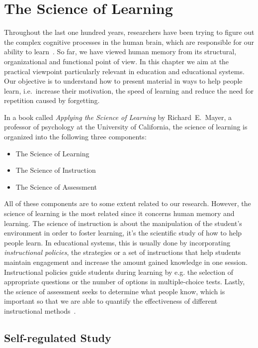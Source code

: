 \section{The Science of Learning}
\label{science-of-learning}

Throughout the last one hundred years, researchers have been trying to figure out the complex cognitive processes in the human brain, which are responsible for our ability to learn~\cite{RichardE.Mayer2010}. So far, we have viewed human memory from its structural, organizational and functional point of view. In this chapter we aim at the practical viewpoint particularly relevant in education and educational systems. Our objective is to understand how to present material in ways to help people learn, i.e.~increase their motivation, the speed of learning and reduce the need for repetition caused by forgetting.

In a book called \textit{Applying the Science of Learning} by Richard~E.~Mayer, a professor of psychology at the University of California, the science of learning is organized into the following three components:

\begin{itemize}
  \item The Science of Learning
  \item The Science of Instruction
  \item The Science of Assessment
\end{itemize}

All of these components are to some extent related to our research. However, the science of learning is the most related since it concerns human memory and learning. The science of instruction is about the manipulation of the student's environment in order to foster learning, it's the scientific study of how to help people learn. In educational systems, this is usually done by incorporating \textit{instructional policies}, the strategies or a set of instructions that help students maintain engagement and increase the amount gained knowledge in one session. Instructional policies guide students during learning by e.g. the selection of appropriate questions or the number of options in multiple-choice tests. Lastly, the science of assessment seeks to determine what people know, which is important so that we are able to quantify the effectiveness of different instructional methods~\cite{RichardE.Mayer2010}.

\subsection{Self-regulated Study}
\label{study}

